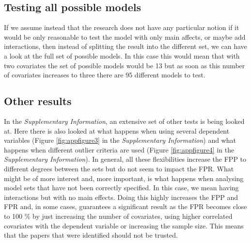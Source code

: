 \subsection{Testing all possible models}
If we assume instead that the research does not have any particular notion if it would be only reasonable to test the model with only main affects, or maybe add interactions, then instead of splitting the result into the different set, we can have a look at the full set of possible models. In this case this would mean that with two covariates the set of possible models would be 13 but as soon as this number of covariates increases to three there are 95 different models to test. 



\subsection{Other results}
In the \textit{Supplementary Information}, an extensive set of other tests is being looked at. Here there is also looked at what happens when using several dependent variables (Figure \ref{fig:appfigure3} in the \textit{Supplementary Information}) and what happens when different outlier criteria are used (Figure \ref{fig:appfigure4} in the \textit{Supplementary Information}). In general, all these flexibilities increase the FPP to different degrees between the sets but do not seem to impact the FPR. What might be of more interest and, more important, is what happens when analysing model sets that have not been correctly specified. In this case, we mean having interactions but with no main effects. Doing this highly increases the FPP and FPR and, in some cases, guarantees a significant result as the FPR becomes close to 100 \% by just increasing the number of covariates, using higher correlated covariates with the dependent variable or increasing the sample size. This means that the papers that were identified should not be trusted.


